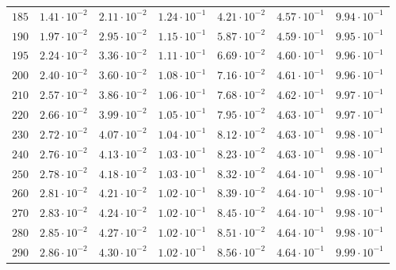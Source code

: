 \begin{table}[h]
\begin{tabular}{lcccccc}
$	185	$ & $	1.41 \cdot 10^{-2}	$ & $	2.11 \cdot 10^{-2}	$ & $	1.24 \cdot 10^{-1}	$ & $	4.21 \cdot 10^{-2}	$ & $	4.57 \cdot 10^{-1}	$ & $	9.94 \cdot 10^{-1}	$ \\
$	190	$ & $	1.97 \cdot 10^{-2}	$ & $	2.95 \cdot 10^{-2}	$ & $	1.15 \cdot 10^{-1}	$ & $	5.87 \cdot 10^{-2}	$ & $	4.59 \cdot 10^{-1}	$ & $	9.95 \cdot 10^{-1}	$ \\
$	195	$ & $	2.24 \cdot 10^{-2}	$ & $	3.36 \cdot 10^{-2}	$ & $	1.11 \cdot 10^{-1}	$ & $	6.69 \cdot 10^{-2}	$ & $	4.60 \cdot 10^{-1}	$ & $	9.96 \cdot 10^{-1}	$ \\
$	200	$ & $	2.40 \cdot 10^{-2}	$ & $	3.60 \cdot 10^{-2}	$ & $	1.08 \cdot 10^{-1}	$ & $	7.16 \cdot 10^{-2}	$ & $	4.61 \cdot 10^{-1}	$ & $	9.96 \cdot 10^{-1}	$ \\
$	210	$ & $	2.57 \cdot 10^{-2}	$ & $	3.86 \cdot 10^{-2}	$ & $	1.06 \cdot 10^{-1}	$ & $	7.68 \cdot 10^{-2}	$ & $	4.62 \cdot 10^{-1}	$ & $	9.97 \cdot 10^{-1}	$ \\
$	220	$ & $	2.66 \cdot 10^{-2}	$ & $	3.99 \cdot 10^{-2}	$ & $	1.05 \cdot 10^{-1}	$ & $	7.95 \cdot 10^{-2}	$ & $	4.63 \cdot 10^{-1}	$ & $	9.97 \cdot 10^{-1}	$ \\
$	230	$ & $	2.72 \cdot 10^{-2}	$ & $	4.07 \cdot 10^{-2}	$ & $	1.04 \cdot 10^{-1}	$ & $	8.12 \cdot 10^{-2}	$ & $	4.63 \cdot 10^{-1}	$ & $	9.98 \cdot 10^{-1}	$ \\
$	240	$ & $	2.76 \cdot 10^{-2}	$ & $	4.13 \cdot 10^{-2}	$ & $	1.03 \cdot 10^{-1}	$ & $	8.23 \cdot 10^{-2}	$ & $	4.63 \cdot 10^{-1}	$ & $	9.98 \cdot 10^{-1}	$ \\
$	250	$ & $	2.78 \cdot 10^{-2}	$ & $	4.18 \cdot 10^{-2}	$ & $	1.03 \cdot 10^{-1}	$ & $	8.32 \cdot 10^{-2}	$ & $	4.64 \cdot 10^{-1}	$ & $	9.98 \cdot 10^{-1}	$ \\
$	260	$ & $	2.81 \cdot 10^{-2}	$ & $	4.21 \cdot 10^{-2}	$ & $	1.02 \cdot 10^{-1}	$ & $	8.39 \cdot 10^{-2}	$ & $	4.64 \cdot 10^{-1}	$ & $	9.98 \cdot 10^{-1}	$ \\
$	270	$ & $	2.83 \cdot 10^{-2}	$ & $	4.24 \cdot 10^{-2}	$ & $	1.02 \cdot 10^{-1}	$ & $	8.45 \cdot 10^{-2}	$ & $	4.64 \cdot 10^{-1}	$ & $	9.98 \cdot 10^{-1}	$ \\
$	280	$ & $	2.85 \cdot 10^{-2}	$ & $	4.27 \cdot 10^{-2}	$ & $	1.02 \cdot 10^{-1}	$ & $	8.51 \cdot 10^{-2}	$ & $	4.64 \cdot 10^{-1}	$ & $	9.98 \cdot 10^{-1}	$ \\
$	290	$ & $	2.86 \cdot 10^{-2}	$ & $	4.30 \cdot 10^{-2}	$ & $	1.02 \cdot 10^{-1}	$ & $	8.56 \cdot 10^{-2}	$ & $	4.64 \cdot 10^{-1}	$ & $	9.99 \cdot 10^{-1}	$ \\

\end{tabular}
\end{table}
